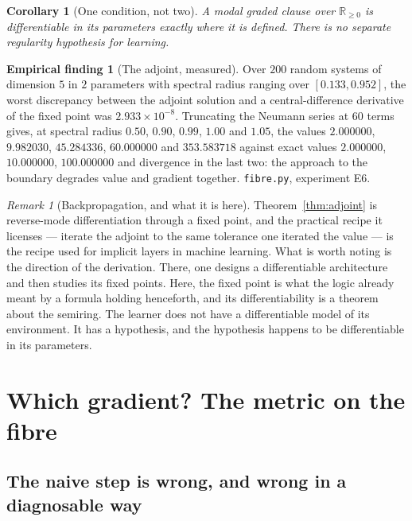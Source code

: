 \documentclass[11pt,a4paper]{article}
\theoremstyle{plain}
\newtheorem{corollary}[theorem]{Corollary}
\theoremstyle{definition}
\newtheorem{finding}[theorem]{Empirical finding}
\theoremstyle{remark}
\newtheorem{remark}[theorem]{Remark}
\newcommand{\Rnn}{\mathbb{R}_{\geq 0}}
\begin{document}
\begin{corollary}[One condition, not two]\label{cor:onecond}
A modal graded clause over $\Rnn$ is differentiable in its parameters exactly
where it is defined. There is no separate regularity hypothesis for learning.
\end{corollary}

\begin{finding}[The adjoint, measured]\label{find:adjoint}
Over $200$ random systems of dimension $5$ in $2$ parameters with spectral radius
ranging over $[0.133, 0.952]$, the worst discrepancy between the adjoint solution
and a central-difference derivative of the fixed point was
$2.933\times10^{-8}$. Truncating the Neumann series at $60$ terms gives, at
spectral radius $0.50$, $0.90$, $0.99$, $1.00$ and $1.05$, the values
$2.000000$, $9.982030$, $45.284336$, $60.000000$ and $353.583718$ against exact
values $2.000000$, $10.000000$, $100.000000$ and divergence in the last two: the
approach to the boundary degrades value and gradient together.
\texttt{fibre.py}, experiment E6.
\end{finding}

\begin{remark}[Backpropagation, and what it is here]\label{rem:backprop}
Theorem~\ref{thm:adjoint} is reverse-mode differentiation through a fixed point,
and the practical recipe it licenses --- iterate the adjoint to the same
tolerance one iterated the value --- is the recipe used for implicit layers in
machine learning. What is worth noting is the direction of the derivation. There,
one designs a differentiable architecture and then studies its fixed points.
Here, the fixed point is what the logic already meant by a formula holding
henceforth, and its differentiability is a theorem about the semiring. The
learner does not have a differentiable model of its environment. It has a
hypothesis, and the hypothesis happens to be differentiable in its parameters.
\end{remark}

\section{Which gradient? The metric on the fibre}\label{sec:natgrad}

\subsection{The naive step is wrong, and wrong in a diagnosable way}
\end{document}
